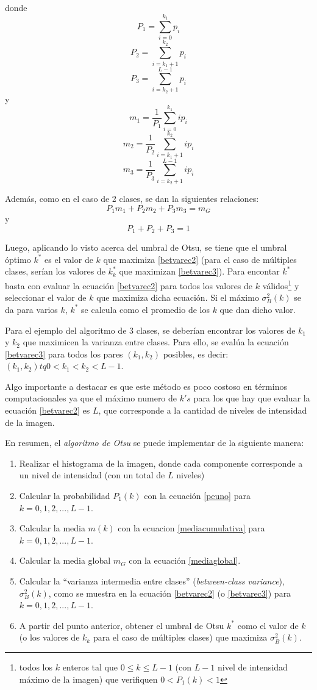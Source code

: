donde $$P_1=\sum_{i=0}^{k_1}p_i$$ $$P_2=\sum_{i=k_1+1}^{k_2}p_i$$  $$P_3=\sum_{i=k_2+1}^{L-1}p_i$$ y $$m_1 = \frac{1}{P_1}\sum_{i=0}^{k_1}ip_i$$  $$m_2 = \frac{1}{P_2}\sum_{i=k_1+1}^{k_2}ip_i$$  $$m_3 = \frac{1}{P_3}\sum_{i=k_2+1}^{L-1}ip_i$$

Además, como en el caso de 2 clases, se dan la siguientes relaciones:
\begin{equation}
  P_1m_1 + P_2m_2 + P_3m_3 = m_G
\end{equation}
y
\begin{equation}
  P_1+P_2+P_3 = 1
\end{equation}

Luego, aplicando lo visto acerca del umbral de Otsu, se tiene que el umbral óptimo $k^*$ es el valor de $k$ que maximiza \ref{betvarec2} (para el caso de múltiples clases, serían los valores de $k_k^*$ que maximizan \ref{betvarec3}). Para encontar $k^*$ basta con evaluar la ecuación \ref{betvarec2} para todos los valores de $k$ válidos\footnote{ todos los $k$ enteros tal que $0{\leq}k{\leq}L-1$ (con $L-1$ nivel de intensidad máximo de la imagen) que verifiquen $0<P_1(k)<1$ } y seleccionar el valor de $k$ que maximiza dicha ecuación. Si el máximo ${\sigma}_B^2(k)$ se da para varios $k$, $k^*$ se calcula como el promedio de los $k$ que dan dicho valor.

Para el ejemplo del algoritmo de 3 clases, se deberían encontrar los valores de $k_1$ y $k_2$ que maximicen la varianza entre clases. Para ello, se evalúa la ecuación \ref{betvarec3} para todos los pares $(k_1,k_2)$ posibles, es decir: $(k_1,k_2) tq 0<k_1<k_2<L-1$.

Algo importante a destacar es que este método es poco costoso en términos computacionales ya que el máximo numero de $k's$ para los que hay que evaluar la ecuación \ref{betvarec2} es $L$, que corresponde a la cantidad de niveles de intensidad de la imagen.

En resumen, el \textit{algoritmo de Otsu} se puede implementar de la siguiente manera:
\begin{enumerate}
 \item Realizar el histograma de la imagen, donde cada componente corresponde a un nivel de intensidad (con un total de $L$ niveles)
 \item Calcular la probabilidad $P_1(k)$ con la ecuación \ref{peuno} para $k=0,1,2,...,L-1$.
 \item Calcular la media $m(k)$ con la ecuacion \ref{mediacumulativa} para $k=0,1,2,...,L-1$.
 \item Calcular la media global $m_G$ con la ecuación \ref{mediaglobal}.
 \item Calcular la ``varianza intermedia entre clases'' (\textit{between-class variance}), ${\sigma}_B^2(k)$, como se muestra en la ecuación \ref{betvarec2} (o \ref{betvarec3})  para $k=0,1,2,...,L-1$.
 \item A partir del punto anterior, obtener el umbral de Otsu $k^*$ como el valor de $k$ (o los valores de $k_k$ para el caso de múltiples clases) que maximiza ${\sigma}_B^2(k)$.
\end{enumerate}

